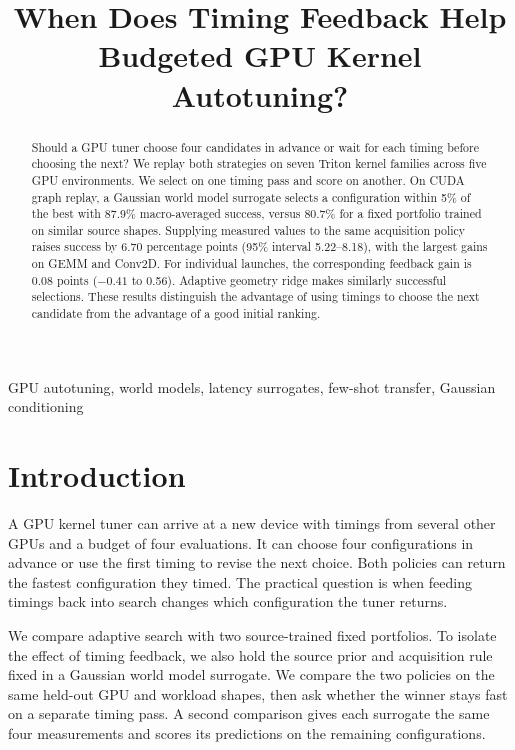 \documentclass[conference]{IEEEtran}
\title{When Does Timing Feedback Help Budgeted GPU Kernel Autotuning?}
\author{\IEEEauthorblockN{Author names pending}\IEEEauthorblockA{Affiliations pending}}
\begin{document}
\maketitle

\begin{abstract}
Should a GPU tuner choose four candidates in advance or wait for each
timing before choosing the next? We replay both strategies on seven
Triton kernel families across five GPU environments. We select on one
timing pass and score on another. On CUDA graph replay, a Gaussian
world model surrogate selects a configuration within 5\% of the best
with 87.9\% macro-averaged success, versus 80.7\% for a fixed portfolio
trained on similar source shapes. Supplying measured values to the
same acquisition policy raises success by 6.70 percentage points
(95\% interval 5.22--8.18), with the largest gains on GEMM and Conv2D.
For individual launches, the corresponding feedback gain is 0.08
points ($-0.41$ to 0.56). Adaptive geometry ridge makes similarly
successful selections. These results distinguish the advantage of
using timings to choose the next candidate from the advantage of a
good initial ranking.
\end{abstract}

\begin{IEEEkeywords}
GPU autotuning, world models, latency surrogates, few-shot transfer, Gaussian conditioning
\end{IEEEkeywords}

\section{Introduction}
A GPU kernel tuner can arrive at a new device with timings from several
other GPUs and a budget of four evaluations. It can choose four
configurations in advance or use the first timing to revise the next
choice. Both policies can return the fastest configuration they timed.
The practical question is when feeding timings back into search changes
which configuration the tuner returns.

We compare adaptive search with two source-trained fixed portfolios. To isolate the effect of timing feedback, we also hold the source prior and acquisition rule fixed in a Gaussian world model surrogate. We compare the two policies
on the same held-out GPU and workload shapes, then ask whether the
winner stays fast on a separate timing pass. A second comparison gives
each surrogate the same four measurements and scores its predictions on
the remaining configurations.
\end{document}
